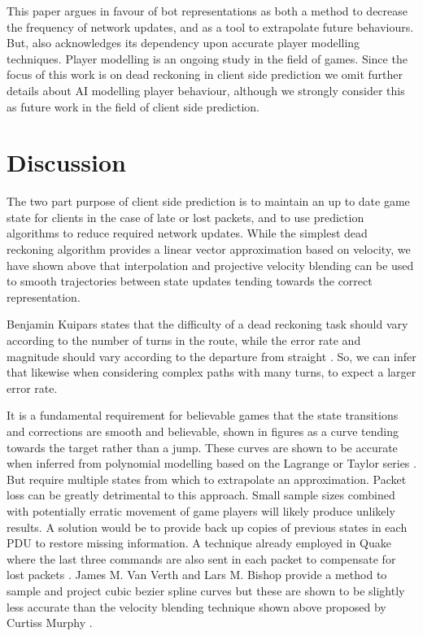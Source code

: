 \documentclass[journal]{IEEEtran}
\begin{document}
This paper argues in favour of bot representations as both a method to decrease the frequency of network updates, and as a tool to extrapolate future behaviours. But, also acknowledges its dependency upon accurate player modelling techniques. Player modelling is an ongoing study in the field of games. Since the focus of this work is on dead reckoning in client side prediction we omit further details about AI modelling player behaviour, although we strongly consider this as future work in the field of client side prediction.

\section{Discussion} \label{discussion}

The two part purpose of client side prediction is to maintain an up to date game state for clients in the case of late or lost packets, and to use prediction algorithms to reduce required network updates. While the simplest dead reckoning algorithm provides a linear vector approximation based on velocity, we have shown above that interpolation and projective velocity blending can be used to smooth trajectories between state updates tending towards the correct representation.

Benjamin Kuipars states that the difficulty of a dead reckoning task should vary according to the number of turns in the route, while the error rate and magnitude should vary according to the departure from straight \cite{kuipers1978modeling}. So, we can infer that likewise when considering complex paths with many turns, to expect a larger error rate.

It is a fundamental requirement for believable games that the state transitions and corrections are smooth and believable, shown in figures as a curve tending towards the target rather than a jump. These curves are shown to be accurate when inferred from polynomial modelling based on the Lagrange or Taylor series \cite{hanawa2006proposal}. But require multiple states from which to extrapolate an approximation. Packet loss can be greatly detrimental to this approach. Small sample sizes combined with potentially erratic movement of game players will likely produce unlikely results. A solution would be to provide back up copies of previous states in each PDU to restore missing information. A technique already employed in Quake where the last three commands are also sent in each packet to compensate for lost packets \cite{cronin2001distributed}. James M. Van Verth and Lars M. Bishop provide a method to sample and project cubic bezier spline curves \cite{van2008essential} but these are shown to be slightly less accurate than the velocity blending technique shown above proposed by Curtiss Murphy \cite{murphy2011believable}. 
\end{document}
